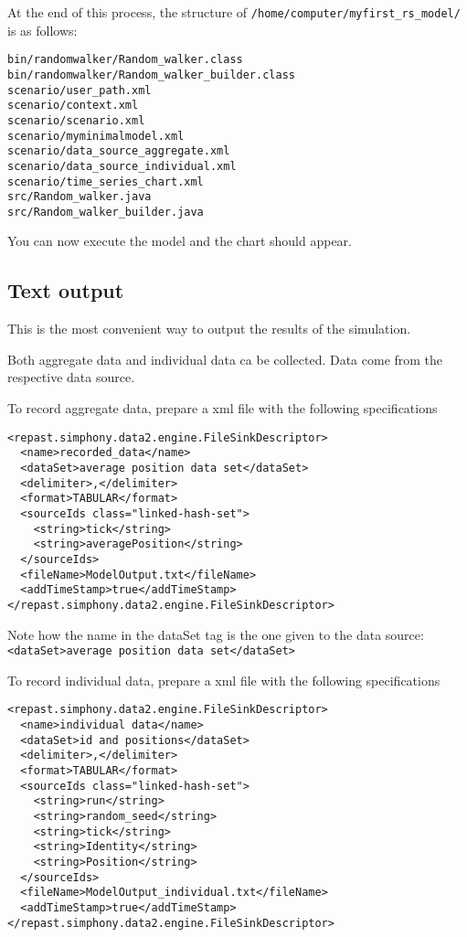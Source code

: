 \documentclass{article}
\begin{document}
At the end of this process, the structure of \verb+/home/computer/myfirst_rs_model/+ is as follows:
\begin{verbatim}
bin/randomwalker/Random_walker.class
bin/randomwalker/Random_walker_builder.class
scenario/user_path.xml
scenario/context.xml
scenario/scenario.xml
scenario/myminimalmodel.xml
scenario/data_source_aggregate.xml
scenario/data_source_individual.xml
scenario/time_series_chart.xml
src/Random_walker.java
src/Random_walker_builder.java
\end{verbatim}

You can now execute the model and the chart should appear.


\subsection{Text output}

This is the most convenient way to output the results of the simulation.

Both aggregate data and individual data ca be collected. Data come from the respective data source. 

To record aggregate data, prepare a xml file with the following specifications

\begin{verbatim}
<repast.simphony.data2.engine.FileSinkDescriptor>
  <name>recorded_data</name>
  <dataSet>average position data set</dataSet>
  <delimiter>,</delimiter>
  <format>TABULAR</format>
  <sourceIds class="linked-hash-set">
    <string>tick</string>
    <string>averagePosition</string>
  </sourceIds>
  <fileName>ModelOutput.txt</fileName>
  <addTimeStamp>true</addTimeStamp>
</repast.simphony.data2.engine.FileSinkDescriptor>
\end{verbatim}

Note how the name in the dataSet tag is the one given to the data source:\\
\verb+<dataSet>average position data set</dataSet>+

\vspace{1cm}
To record individual data, prepare a xml file with the following specifications

\begin{verbatim}
<repast.simphony.data2.engine.FileSinkDescriptor>
  <name>individual data</name>
  <dataSet>id and positions</dataSet>
  <delimiter>,</delimiter>
  <format>TABULAR</format>
  <sourceIds class="linked-hash-set">
    <string>run</string>
    <string>random_seed</string>
    <string>tick</string>
    <string>Identity</string>
    <string>Position</string>
  </sourceIds>
  <fileName>ModelOutput_individual.txt</fileName>
  <addTimeStamp>true</addTimeStamp>
</repast.simphony.data2.engine.FileSinkDescriptor>
\end{verbatim}
\end{document}

